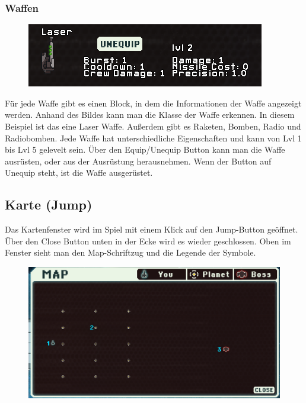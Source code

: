 \documentclass[fontsize=12pt,paper=a4,twoside]{scrartcl}
\begin{document}
\subsubsection{Waffen} \label{sec:Waffen}

\begin{figure}[H]
\centering
\includegraphics[width=0.8\linewidth]{DasSpiel/Inventar/waffe.png}
\end{figure} 

Für jede Waffe gibt es einen Block, in dem die Informationen der Waffe angezeigt werden. Anhand des Bildes kann man die Klasse der Waffe erkennen. In diesem Beispiel ist das eine Laser Waffe. Außerdem gibt es Raketen, Bomben, Radio und Radiobomben. Jede Waffe hat unterschiedliche Eigenschaften und kann von Lvl 1 bis Lvl 5 gelevelt sein. Über den Equip/Unequip Button kann man die Waffe ausrüsten, oder aus der Ausrüstung herausnehmen. Wenn der Button auf Unequip steht, ist die Waffe ausgerüstet. 




\subsection{Karte (Jump)}

Das Kartenfenster wird im Spiel mit einem Klick auf den Jump-Button geöffnet. Über den Close Button unten in der Ecke wird es wieder geschlossen. Oben im Fenster sieht man den Map-Schriftzug und die Legende der Symbole.

\begin{figure}[H]
\centering
\includegraphics[width=0.8\linewidth]{dasspiel/karte/karteuebersicht.png}
\end{figure} 
\end{document}
